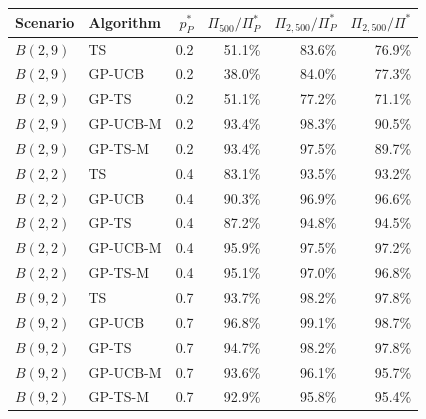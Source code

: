 \begin{tabular}{llrrrr}
\toprule
Scenario & Algorithm & $p^*_P$ & $\Pi_{500}/\Pi^*_P$ & $\Pi_{2{,}500}/\Pi^*_P$ & $\Pi_{2{,}500}/\Pi^*$ \\
\midrule
$B(2,9)$ & TS & 0.2 & 51.1\% & 83.6\% & 76.9\% \\
$B(2,9)$ & GP-UCB & 0.2 & 38.0\% & 84.0\% & 77.3\% \\
$B(2,9)$ & GP-TS & 0.2 & 51.1\% & 77.2\% & 71.1\% \\
$B(2,9)$ & GP-UCB-M & 0.2 & 93.4\% & 98.3\% & 90.5\% \\
$B(2,9)$ & GP-TS-M & 0.2 & 93.4\% & 97.5\% & 89.7\% \\
$B(2,2)$ & TS & 0.4 & 83.1\% & 93.5\% & 93.2\% \\
$B(2,2)$ & GP-UCB & 0.4 & 90.3\% & 96.9\% & 96.6\% \\
$B(2,2)$ & GP-TS & 0.4 & 87.2\% & 94.8\% & 94.5\% \\
$B(2,2)$ & GP-UCB-M & 0.4 & 95.9\% & 97.5\% & 97.2\% \\
$B(2,2)$ & GP-TS-M & 0.4 & 95.1\% & 97.0\% & 96.8\% \\
$B(9,2)$ & TS & 0.7 & 93.7\% & 98.2\% & 97.8\% \\
$B(9,2)$ & GP-UCB & 0.7 & 96.8\% & 99.1\% & 98.7\% \\
$B(9,2)$ & GP-TS & 0.7 & 94.7\% & 98.2\% & 97.8\% \\
$B(9,2)$ & GP-UCB-M & 0.7 & 93.6\% & 96.1\% & 95.7\% \\
$B(9,2)$ & GP-TS-M & 0.7 & 92.9\% & 95.8\% & 95.4\% \\
\bottomrule
\end{tabular}

